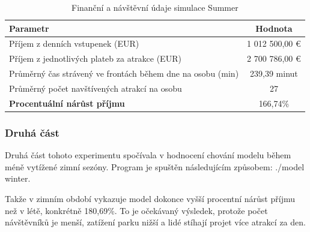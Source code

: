 \documentclass[a4paper,12pt]{article}
\begin{document}
\begin{table}[h!]
	\centering
	\caption{Finanční a návštěvní údaje simulace Summer}
	\label{tab:financial_and_visit_data}
	\begin{tabular}{|l|c|}
		\hline
		\textbf{Parametr}                                         & \textbf{Hodnota} \\ \hline
		Příjem z denních vstupenek (EUR)                          & 1 012 500,00 €   \\ \hline
		Příjem z jednotlivých plateb za atrakce (EUR)             & 2 700 786,00 €   \\ \hline
		Průměrný čas strávený ve frontách během dne na osobu (min) & 239,39 minut     \\ \hline
		Průměrný počet navštívených atrakcí na osobu             & 27               \\ \hline
		\textbf{Procentuální nárůst příjmu}                       & 166,74\%         \\ \hline
	\end{tabular}
\end{table}

\subsubsection{Druhá část}
Druhá část tohoto experimentu spočívala v hodnocení chování modelu během méně vytížené zimní sezóny. Program je spuštěn následujícím způsobem: ./model winter.

Takže v zimním období vykazuje model dokonce vyšší procentní nárůst příjmu než v létě, konkrétně 180,69\%. To je očekávaný výsledek, protože počet návštěvníků je menší, zatížení parku nižší a lidé stíhají projet více atrakcí za den.
\end{document}
